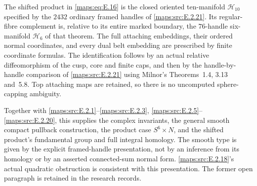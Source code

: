\begin{proposition}\label{maps:src:E.2.4}


The shifted product in \eqref{maps:eq:E.16} is the closed oriented ten-manifold
$\mathcal H_{10}$ specified by the $2432$ ordinary framed handles
of \ref{maps:src:E.2.21}. Its regular-fibre complement is, relative to its entire
marked boundary, the $76$-handle six-manifold $\mathcal H_6$ of
that theorem. The full attaching embeddings, their ordered normal
coordinates, and every dual belt embedding are prescribed by
finite coordinate formulas. The identification follows by an
actual relative diffeomorphism of the cusp, core and finite caps,
and then by the handle-by-handle comparison of \ref{maps:src:E.2.21} using
Milnor's Theorems~1.4, 3.13 and~5.8. Top attaching maps are
retained, so there is no uncomputed sphere-capping ambiguity.

Together with \ref{maps:src:E.2.1}--\ref{maps:src:E.2.3}, \ref{maps:src:E.2.5}--\ref{maps:src:E.2.20}, this supplies the complex
invariants, the general smooth compact pullback construction,
the product case $S^6\times N$, and the shifted product's
fundamental group and full integral homology. The smooth type
is given by the explicit framed-handle presentation, not by an
inference from its homology or by an asserted connected-sum
normal form. \ref{maps:src:E.2.18}'s actual quadratic obstruction is consistent
with this presentation. The former open paragraph is retained
in the research records.


\end{proposition}
